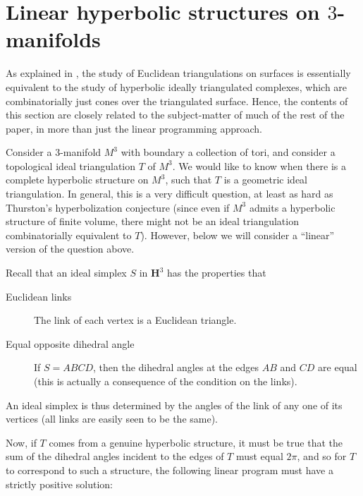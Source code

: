 \documentclass{acmart}
\begin{document}
\section{Linear hyperbolic structures on $3$-manifolds}
\label{lhyp}

As explained in \cite{rvol}, the study of Euclidean triangulations on
surfaces is essentially equivalent to the study of hyperbolic ideally
triangulated complexes, which are combinatorially just cones over the
triangulated surface. Hence, the contents of this section are closely
related to the subject-matter of much of the rest of the paper, in
more than just the linear programming approach.

Consider a $3$-manifold $M^3$ with boundary a collection of tori, and
consider a topological ideal triangulation $T$ of $M^3$. We would like
to know when there is a complete hyperbolic structure on $M^3$, such
that $T$ is a geometric ideal triangulation. In general, this is a
very difficult question, at least as hard as Thurston's
hyperbolization conjecture (since even if $M^3$ admits a hyperbolic
structure of finite volume, there might not be an ideal triangulation
combinatorially equivalent to $T$). However, below we will consider a
``linear'' version of the question above. 

Recall that an ideal simplex $S$ in $\mathbf{H}^3$ has the properties that

\begin{description}

\item[Euclidean links]
The link of each vertex is a Euclidean triangle.

\item[Equal opposite dihedral angle]
If $S = ABCD$, then the dihedral angles at the edges $AB$ and $CD$ are
equal (this is actually a consequence of the condition on the links).
\end{description}

An ideal simplex is thus determined by the angles of the link of any
one of its vertices (all links are easily seen to be the same).

Now, if $T$ comes from a genuine hyperbolic structure, it must be true
that the sum of the dihedral angles incident to the edges of $T$ must
equal $2\pi$, and so for $T$ to correspond to such a structure, the
following linear program must have a strictly positive solution:
\end{document}
